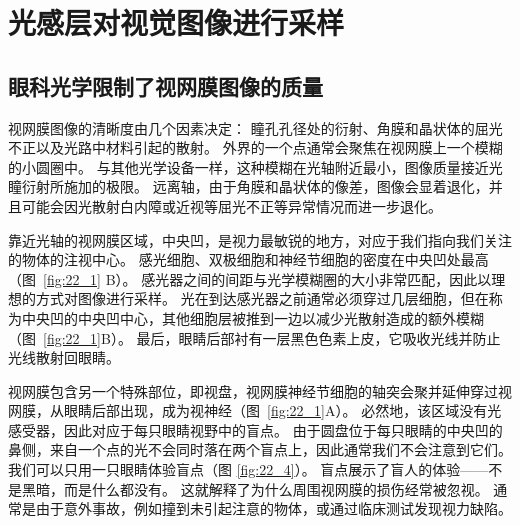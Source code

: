 \section{光感层对视觉图像进行采样}

\subsection{眼科光学限制了视网膜图像的质量}

视网膜图像的清晰度由几个因素决定：
瞳孔孔径处的衍射、角膜和晶状体的屈光不正以及光路中材料引起的散射。
外界的一个点通常会聚焦在视网膜上一个模糊的小圆圈中。
与其他光学设备一样，这种模糊在光轴附近最小，图像质量接近光瞳衍射所施加的极限。
远离轴，由于角膜和晶状体的像差，图像会显着退化，并且可能会因光散射白内障或近视等屈光不正等异常情况而进一步退化。


靠近光轴的视网膜区域，中央凹，是视力最敏锐的地方，对应于我们指向我们关注的物体的注视中心。
感光细胞、双极细胞和神经节细胞的密度在中央凹处最高（图~\ref{fig:22_1} B）。
感光器之间的间距与光学模糊圈的大小非常匹配，因此以理想的方式对图像进行采样。
光在到达感光器之前通常必须穿过几层细胞，但在称为中央凹的中央凹中心，其他细胞层被推到一边以减少光散射造成的额外模糊（图~\ref{fig:22_1}B）。
最后，眼睛后部衬有一层黑色色素上皮，它吸收光线并防止光线散射回眼睛。


视网膜包含另一个特殊部位，即视盘，视网膜神经节细胞的轴突会聚并延伸穿过视网膜，从眼睛后部出现，成为视神经（图~\ref{fig:22_1}A）。
必然地，该区域没有光感受器，因此对应于每只眼睛视野中的盲点。
由于圆盘位于每只眼睛的中央凹的鼻侧，来自一个点的光不会同时落在两个盲点上，因此通常我们不会注意到它们。 
我们可以只用一只眼睛体验盲点（图 \ref{fig:22_4}）。 
盲点展示了盲人的体验——不是黑暗，而是什么都没有。 
这就解释了为什么周围视网膜的损伤经常被忽视。 
通常是由于意外事故，例如撞到未引起注意的物体，或通过临床测试发现视力缺陷。

